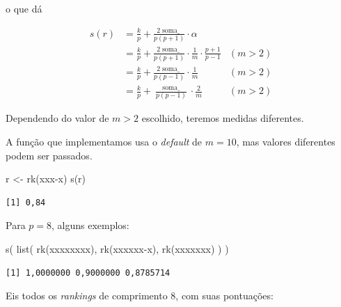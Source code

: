 \documentclass[
  letterpaper,
  DIV=11,
  numbers=noendperiod]{scrreprt}
\newenvironment{Shaded}{\begin{snugshade}}{\end{snugshade}}
\newcommand{\FunctionTok}[1]{\textcolor[rgb]{0.28,0.35,0.67}{#1}}
\newcommand{\NormalTok}[1]{\textcolor[rgb]{0.00,0.23,0.31}{#1}}
\newcommand{\OtherTok}[1]{\textcolor[rgb]{0.00,0.23,0.31}{#1}}
\newcommand{\StringTok}[1]{\textcolor[rgb]{0.13,0.47,0.30}{#1}}
\begin{document}
\begin{itemize}
  o que dá

  \[
  \begin{aligned}
  s(r) 
  &= \frac{k}{p} + \frac{2\operatorname{soma\_}}{p(p+1)} \cdot \alpha \\
  &= \frac{k}{p} + \frac{2\operatorname{soma\_}}{p(p+1)} \cdot 
    \frac1m \cdot \frac{p + 1}{p - 1} & (m > 2) \\
  &= \frac{k}{p} + \frac{2\operatorname{soma\_}}{p(p-1)} \cdot 
    \frac1m & (m > 2) \\
  &= \frac{k}{p} + \frac{\operatorname{soma\_}}{p(p-1)} \cdot 
    \frac2m & (m > 2)
  \end{aligned}
  \]

  Dependendo do valor de $m > 2$ escolhido, teremos medidas diferentes.

  A função que implementamos usa o \emph{default} de $m = 10$, mas
  valores diferentes podem ser passados.
\end{itemize}

\begin{Shaded}
\begin{Highlighting}[]
\NormalTok{r }\OtherTok{\textless{}{-}} \FunctionTok{rk}\NormalTok{(}\StringTok{\textquotesingle{}xxx{-}x\textquotesingle{}}\NormalTok{)}
\FunctionTok{s}\NormalTok{(r)}
\end{Highlighting}
\end{Shaded}

\begin{verbatim}
[1] 0,84
\end{verbatim}

Para $p = 8$, alguns exemplos:

\begin{Shaded}
\begin{Highlighting}[]
\FunctionTok{s}\NormalTok{(}
  \FunctionTok{list}\NormalTok{(}
    \FunctionTok{rk}\NormalTok{(}\StringTok{\textquotesingle{}xxxxxxxx\textquotesingle{}}\NormalTok{),}
    \FunctionTok{rk}\NormalTok{(}\StringTok{\textquotesingle{}xxxxxx{-}x\textquotesingle{}}\NormalTok{),}
    \FunctionTok{rk}\NormalTok{(}\StringTok{\textquotesingle{}{-}xxxxxxx\textquotesingle{}}\NormalTok{)}
\NormalTok{  )}
\NormalTok{)}
\end{Highlighting}
\end{Shaded}

\begin{verbatim}
[1] 1,0000000 0,9000000 0,8785714
\end{verbatim}

Eis todos os \emph{rankings} de comprimento $8$, com suas pontuações:
\end{document}
